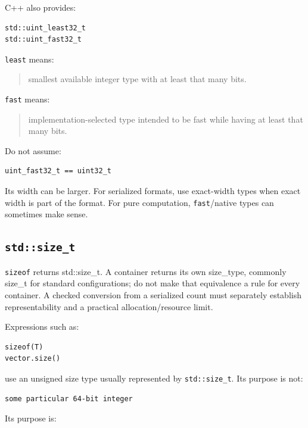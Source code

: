 C++ also provides:

\begin{verbatim}
std::uint_least32_t
std::uint_fast32_t
\end{verbatim}

\texttt{least} means:

\begin{quote}
smallest available integer type with at least that many bits.
\end{quote}

\texttt{fast} means:

\begin{quote}
implementation-selected type intended to be fast while having at least that many bits.
\end{quote}

Do not assume:

\begin{verbatim}
uint_fast32_t == uint32_t
\end{verbatim}

Its width can be larger. For serialized formats, use exact-width types when exact width is part of the format. For pure computation, \texttt{fast}/native types can sometimes make sense.

\subsection{\texorpdfstring{\texttt{std::size\_t}}{std::size\_t}}\label{05-engine-i-ch002-stdsize_t}

\hypertarget{05-engine-i-ch002-stdsize_t}{}

\texttt{sizeof} returns std::size\_t. A container returns its own size\_type, commonly size\_t for standard configurations; do not make that equivalence a rule for every container. A checked conversion from a serialized count must separately establish representability and a practical allocation/resource limit.

Expressions such as:

\begin{verbatim}
sizeof(T)
vector.size()
\end{verbatim}

use an unsigned size type usually represented by \texttt{std::size\_t}. Its purpose is not:

\begin{verbatim}
some particular 64-bit integer
\end{verbatim}

Its purpose is:

